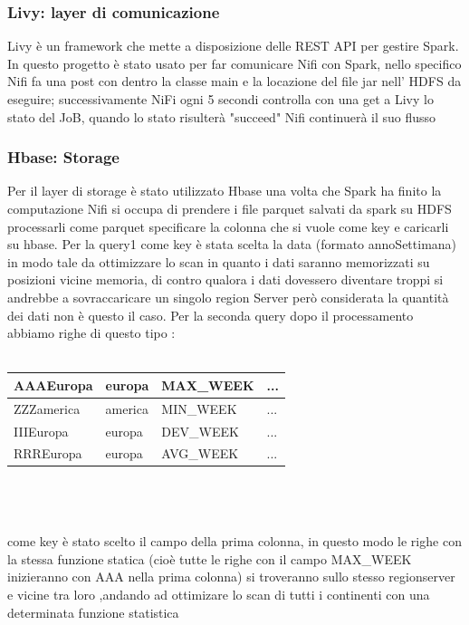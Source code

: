 \documentclass[acmsmall]{acmart}
\begin{document}
\subsubsection{Livy: layer di comunicazione}
Livy è un framework che mette a disposizione delle REST API per gestire Spark. In questo progetto è stato usato per far comunicare Nifi con Spark, nello specifico Nifi fa una post con dentro la classe main e la locazione del file jar nell' HDFS  da eseguire;
successivamente NiFi ogni 5 secondi controlla con una get a Livy lo stato del JoB, quando lo stato risulterà "succeed" Nifi continuerà il suo flusso 

\subsubsection{Hbase: Storage}
Per il layer di storage è stato utilizzato Hbase una volta che Spark ha finito la computazione Nifi si occupa di prendere i file parquet salvati 
da spark su HDFS processarli come parquet specificare la colonna che si vuole come key e caricarli su hbase.
Per la query1 come key è stata scelta la data (formato annoSettimana) in modo tale da ottimizzare lo scan in quanto i dati saranno memorizzati su posizioni vicine memoria, di contro qualora i dati dovessero diventare troppi si andrebbe a sovraccaricare un singolo region Server però considerata la quantità dei dati non è questo il caso.  Per la seconda query dopo il processamento abbiamo righe di questo tipo :
\\
\\
\hspace{40mm}\begin{tabular}{|l|l|l|l|}
\hline
AAAEuropa  & europa  & MAX\_WEEK & ... \\ \hline
ZZZamerica & america & MIN\_WEEK & ... \\ \hline
IIIEuropa  & europa  & DEV\_WEEK & ... \\ \hline
RRREuropa  & europa  & AVG\_WEEK & ... \\ \hline
\end{tabular}
\\
\\
\\

 come key è stato scelto il campo della prima colonna, in questo modo le righe con la stessa funzione statica (cioè tutte le righe con il campo MAX\_WEEK inizieranno con AAA nella prima colonna) si troveranno sullo stesso regionserver e vicine tra loro ,andando ad ottimizare lo scan di tutti i continenti con una determinata funzione statistica
\end{document}
